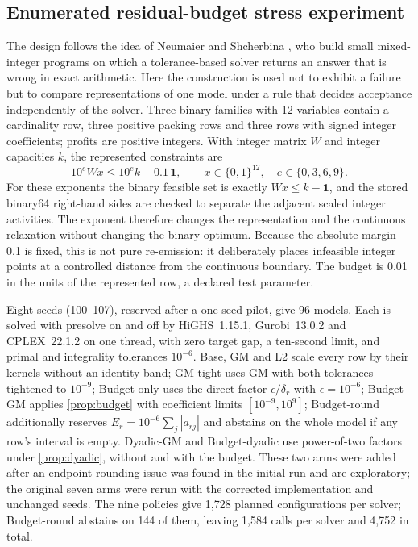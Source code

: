 \documentclass[11pt]{article}
\theoremstyle{definition}
\theoremstyle{remark}
\begin{document}
\subsection{Enumerated residual-budget stress experiment}
\label{subsec:design-stress}
The design follows the idea of Neumaier and Shcherbina \cite{neumaier2004safe}, who build
small mixed-integer programs on which a tolerance-based solver returns an answer that is wrong
in exact arithmetic. Here the construction is used not to exhibit a failure but to compare
representations of one model under a rule that decides acceptance independently of the solver.
Three binary families with 12 variables contain a cardinality row, three positive packing rows
and three rows with signed integer coefficients; profits are positive integers. With integer
matrix $W$ and integer capacities $k$, the represented constraints are
\begin{equation}\label{eq:stress-family}
 10^e Wx\le 10^e k-0.1\,\boldsymbol 1,\qquad x\in\{0,1\}^{12},
 \quad e\in\{0,3,6,9\}.
\end{equation}
For these exponents the binary feasible set is exactly $Wx\le k-\boldsymbol 1$, and the stored
binary64 right-hand sides are checked to separate the adjacent scaled integer activities. The
exponent therefore changes the representation and the continuous relaxation without changing
the binary optimum. Because the absolute margin 0.1 is fixed, this is not pure re-emission: it
deliberately places infeasible integer points at a controlled distance from the continuous
boundary. The budget is 0.01 in the units of the represented row, a declared test parameter.

Eight seeds (100--107), reserved after a one-seed pilot, give 96 models. Each is solved with
presolve on and off by HiGHS~1.15.1, Gurobi~13.0.2 and CPLEX~22.1.2 on one thread, with zero
target gap, a
ten-second limit, and primal and integrality tolerances $10^{-6}$. Base, GM and L2 scale every
row by their kernels without an identity band; GM-tight uses GM with both tolerances tightened
to $10^{-9}$; Budget-only uses the direct factor $\epsilon/\delta_r$ with $\epsilon=10^{-6}$;
Budget-GM applies \cref{prop:budget} with coefficient limits $[10^{-9},10^9]$; Budget-round
additionally reserves $E_r=10^{-6}\sum_j|a_{rj}|$ and abstains on the whole model if any row's
interval is empty. Dyadic-GM and Budget-dyadic use power-of-two factors under
\cref{prop:dyadic}, without and with the budget. These two arms were added after an endpoint
rounding issue was found in the initial run and are exploratory; the original seven arms were
rerun with the corrected implementation and unchanged seeds. The nine policies give 1,728
planned configurations per solver; Budget-round abstains on 144 of them, leaving 1,584 calls
per solver and 4,752 in total.
\end{document}
